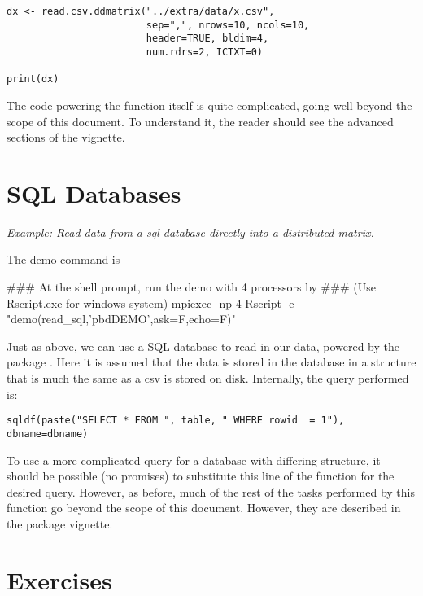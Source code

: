 \begin{lstlisting}[language=rr,title=Reading a CSV with Multiple Readers]
dx <- read.csv.ddmatrix("../extra/data/x.csv", 
                        sep=",", nrows=10, ncols=10, 
                        header=TRUE, bldim=4, 
                        num.rdrs=2, ICTXT=0)

print(dx)
\end{lstlisting}

The code powering the function itself is quite complicated, going well beyond the scope of this document.  To understand it, the reader should see the advanced sections of the  vignette.

\section{SQL Databases}
\label{sec:sql_db}

\emph{Example:  Read data from a sql database directly into a distributed matrix.}

The demo command is
\begin{Command}
### At the shell prompt, run the demo with 4 processors by
### (Use Rscript.exe for windows system)
mpiexec -np 4 Rscript -e "demo(read_sql,'pbdDEMO',ask=F,echo=F)"
\end{Command}

Just as above, we can use a SQL database to read in our data, powered by the  package \citep{sqldf}.  Here it is assumed that the data is stored in the database in a structure that is much the same as a csv is stored on disk.  Internally, the query performed is:

\begin{lstlisting}[language=rr]
sqldf(paste("SELECT * FROM ", table, " WHERE rowid  = 1"), dbname=dbname)
\end{lstlisting}

To use a more complicated query for a database with differing structure, it should be possible (no promises) to substitute this line of the  function for the desired query.  However, as before, much of the rest of the tasks performed by this function go beyond the scope of this document.  However, they are described in the  package vignette.







\section{Exercises}
\label{sec:reading_exercise}


